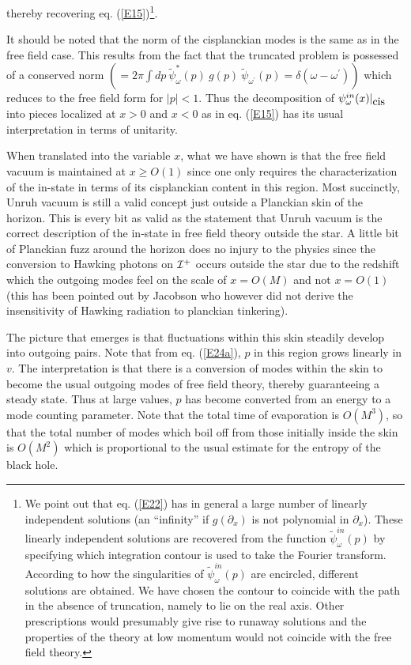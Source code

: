 \documentclass[12pt]{article}
\begin{document}
thereby recovering  eq. (\ref{E15})\footnote{
We point out that eq. (\ref{E22}) has in general a large number of
linearly independent solutions (an ``infinity'' if $g(\partial_x)$ is not
polynomial in $\partial_x$). These linearly independent solutions are
recovered from the function $ \tilde
\psi ^{in}_\omega (p)$ by specifying which integration contour is used
to take the Fourier transform. According to how the singularities of $\tilde
\psi ^{in}_\omega (p)$ are encircled, different solutions are obtained.
We have chosen the contour to coincide with the path in the absence of
truncation, namely to lie on the real axis. Other prescriptions would
presumably give rise to runaway solutions and the properties of the
theory at low momentum would not coincide with the free field theory.}.


It should be noted that the norm of the cisplanckian modes is the same 
as in the
free field case. This results from the fact that the truncated problem is
possessed of a conserved norm $(= 2\pi\int \!dp \ 
\tilde \psi ^{*}_\omega (p)\  g(p)\ \tilde \psi_{\omega^\prime}(p)
= 
\delta(\omega - \omega^\prime))$ which reduces to the free field
form for $\vert p \vert <1$. Thus the decomposition of  
$\psi ^{in}_\omega (x)\vert_{\mbox{\rm cis}}$
into pieces localized at $x>0$ and $x<0$
 as in  eq. (\ref{E15}) has its usual interpretation
in terms of unitarity.

When translated into the variable $x$, what we have shown is that the free field
vacuum is maintained at $x\geq O(1)$ since one only requires the
characterization of the in-state in terms of its cisplanckian content in this
region. Most succinctly, Unruh vacuum is still a valid concept just outside a
Planckian skin of the horizon. This is every bit as valid as the statement that
Unruh vacuum is the correct description of the in-state in free field theory
outside the star. A little bit of Planckian fuzz around the horizon does no
injury to the physics since the conversion to Hawking photons on ${\cal I}^+$
occurs outside the star due to the redshift which the outgoing modes feel on the
scale of $x=O(M)$ and not $x=O(1)$ (this has been pointed out by
Jacobson \cite{Jacobson2} who however did not derive the insensitivity of
Hawking radiation to  planckian tinkering).

The picture that emerges is that fluctuations within this skin steadily develop
into outgoing pairs. Note that from  eq. (\ref{E24a}), $p$ in this
region grows linearly in $v$. The interpretation is that there is a conversion
of modes within the skin to become the usual outgoing modes of free field
theory, thereby guaranteeing a steady state. Thus at large values, $p$ has
become converted from an energy to a mode counting parameter. Note that the
total time of evaporation is $O(M^3)$, so that the total
number of modes which boil off from those initially inside the skin is $O(M^2)$
which is proportional to the usual estimate for the entropy of the black hole.
\end{document}
